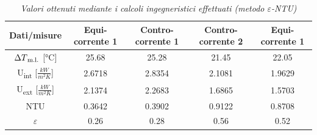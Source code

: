 \documentclass[a4paper,10pt]{article}                                                                                       %
\begin{document}
\begin{table}[H]                                                                                                            %
  \centering                                                                                                                %
  \begin{tabular}{||c|c|c|c|c||}                                                                                            %
    \hline
    Dati/misure                                 & Equi-corrente 1 & Contro-corrente 1 & Contro-corrente 2 & Equi-corrente 1 \\
    \hline\hline
    $\Delta{T\textsubscript{m.l.}}$ [°C]        & 25.68           & 25.28             & 21.45             & 22.05           \\
    U\textsubscript{int} [$\frac{kW}{m^{2}K}$]  & 2.6718          & 2.8354            & 2.1081            & 1.9629          \\
    U\textsubscript{ext} [$\frac{kW}{m^{2}K}$]  & 2.1374          & 2.2683            & 1.6865            & 1.5703          \\
    NTU                                         & 0.3642          & 0.3902            & 0.9122            & 0.8708          \\
    $\varepsilon$                               & 0.26            & 0.28              & 0.56              & 0.52            \\
    \hline
  \end{tabular}                                                                                                             %
  \caption{\textit{Valori ottenuti mediante i calcoli ingegneristici effettuati (metodo $\varepsilon$-NTU)}}                %
  \label{tab:eps_ntu_calcs}                                                                                                 %
\end{table}                                                                                                                 %
\vspace{3mm}                                                                                                                %
\end{document}
